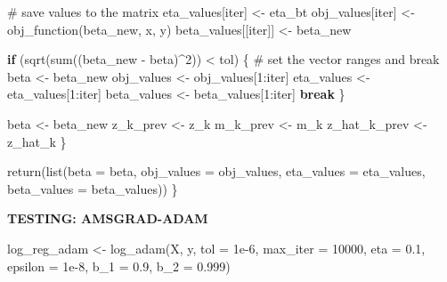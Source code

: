 \documentclass[
  letterpaper,
  DIV=11,
  numbers=noendperiod]{scrartcl}
\newenvironment{Shaded}{\begin{snugshade}}{\end{snugshade}}
\newcommand{\AttributeTok}[1]{\textcolor[rgb]{0.40,0.45,0.13}{#1}}
\newcommand{\CommentTok}[1]{\textcolor[rgb]{0.37,0.37,0.37}{#1}}
\newcommand{\ControlFlowTok}[1]{\textcolor[rgb]{0.00,0.23,0.31}{\textbf{#1}}}
\newcommand{\DecValTok}[1]{\textcolor[rgb]{0.68,0.00,0.00}{#1}}
\newcommand{\FloatTok}[1]{\textcolor[rgb]{0.68,0.00,0.00}{#1}}
\newcommand{\FunctionTok}[1]{\textcolor[rgb]{0.28,0.35,0.67}{#1}}
\newcommand{\NormalTok}[1]{\textcolor[rgb]{0.00,0.23,0.31}{#1}}
\newcommand{\OtherTok}[1]{\textcolor[rgb]{0.00,0.23,0.31}{#1}}
\newcommand{\SpecialCharTok}[1]{\textcolor[rgb]{0.37,0.37,0.37}{#1}}
\begin{document}
\begin{Shaded}
\begin{Highlighting}[]
    \CommentTok{\# save values to the matrix}
\NormalTok{    eta\_values[iter] }\OtherTok{\textless{}{-}}\NormalTok{ eta\_bt}
\NormalTok{    obj\_values[iter] }\OtherTok{\textless{}{-}} \FunctionTok{obj\_function}\NormalTok{(beta\_new, x, y)}
\NormalTok{    beta\_values[[iter]] }\OtherTok{\textless{}{-}}\NormalTok{ beta\_new}
    
    \ControlFlowTok{if}\NormalTok{ (}\FunctionTok{sqrt}\NormalTok{(}\FunctionTok{sum}\NormalTok{((beta\_new }\SpecialCharTok{{-}}\NormalTok{ beta)}\SpecialCharTok{\^{}}\DecValTok{2}\NormalTok{)) }\SpecialCharTok{\textless{}}\NormalTok{ tol) \{}
      \CommentTok{\# set the vector ranges and break}
\NormalTok{      beta }\OtherTok{\textless{}{-}}\NormalTok{ beta\_new}
\NormalTok{      obj\_values }\OtherTok{\textless{}{-}}\NormalTok{ obj\_values[}\DecValTok{1}\SpecialCharTok{:}\NormalTok{iter]}
\NormalTok{      eta\_values }\OtherTok{\textless{}{-}}\NormalTok{ eta\_values[}\DecValTok{1}\SpecialCharTok{:}\NormalTok{iter]}
\NormalTok{      beta\_values }\OtherTok{\textless{}{-}}\NormalTok{ beta\_values[}\DecValTok{1}\SpecialCharTok{:}\NormalTok{iter]}
      \ControlFlowTok{break}
\NormalTok{    \}}
    
\NormalTok{    beta }\OtherTok{\textless{}{-}}\NormalTok{ beta\_new}
\NormalTok{    z\_k\_prev }\OtherTok{\textless{}{-}}\NormalTok{ z\_k}
\NormalTok{    m\_k\_prev }\OtherTok{\textless{}{-}}\NormalTok{ m\_k}
\NormalTok{    z\_hat\_k\_prev }\OtherTok{\textless{}{-}}\NormalTok{ z\_hat\_k}
\NormalTok{  \}}
  
  \FunctionTok{return}\NormalTok{(}\FunctionTok{list}\NormalTok{(}\AttributeTok{beta =}\NormalTok{ beta, }\AttributeTok{obj\_values =}\NormalTok{ obj\_values, }\AttributeTok{eta\_values =}\NormalTok{ eta\_values, }\AttributeTok{beta\_values =}\NormalTok{ beta\_values))}
\NormalTok{\}}
\end{Highlighting}
\end{Shaded}

\textbf{TESTING: AMSGRAD-ADAM}

\begin{Shaded}
\begin{Highlighting}[]
\NormalTok{log\_reg\_adam }\OtherTok{\textless{}{-}} \FunctionTok{log\_adam}\NormalTok{(X, y, }\AttributeTok{tol =} \FloatTok{1e{-}6}\NormalTok{, }\AttributeTok{max\_iter =} \DecValTok{10000}\NormalTok{, }\AttributeTok{eta =} \FloatTok{0.1}\NormalTok{, }\AttributeTok{epsilon =} \FloatTok{1e{-}8}\NormalTok{, }\AttributeTok{b\_1 =} \FloatTok{0.9}\NormalTok{, }\AttributeTok{b\_2 =} \FloatTok{0.999}\NormalTok{)}
\end{Highlighting}
\end{Shaded}
\end{document}
